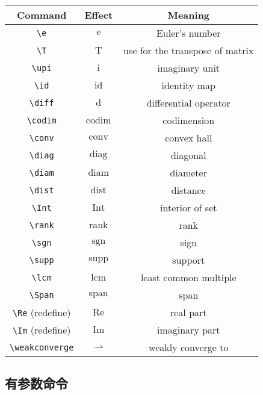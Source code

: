 \documentclass{article}
\begin{document}
\begin{center}
  \begin{tabular}{ccc}
    \toprule
      Command & Effect & Meaning \\
    \midrule
      \verb|\e|  & $\mathrm{e}$ & Euler's number \\
      \verb|\T|  & $\mathrm{T}$ & use for the transpose of matrix \\
      \verb|\upi| & $\mathrm{i}$ & imaginary unit \\
      \verb|\id|  & $\mathrm{id}$ & identity map \\
      \verb|\diff| & $\mathrm{d}$ & differential operator \\
      \verb|\codim| & $\operatorname{codim}$ & codimension \\
      \verb|\conv| & $\operatorname{conv}$ & convex hall \\
      \verb|\diag| & $\operatorname{diag}$ & diagonal \\
      \verb|\diam| & $\operatorname{diam}$ & diameter \\
      \verb|\dist| & $\operatorname{dist}$ & distance \\
      \verb|\Int|  & $\operatorname{Int}$  & interior of set \\
      \verb|\rank| & $\operatorname{rank}$ & rank \\
      \verb|\sgn|  & $\operatorname{sgn}$ & sign \\
      \verb|\supp| & $\operatorname{supp}$ & support \\
      \verb|\lcm| & $\operatorname{lcm}$ & least common multiple \\
      \verb|\Span| & $\operatorname{span}$ & span \\
      \verb|\Re| (redefine) & $\operatorname{Re}$ & real part \\
      \verb|\Im| (redefine) & $\operatorname{Im}$ & imaginary part \\
      \verb|\weakconverge|  & $\rightharpoonup$   & weakly converge to \\ 
    \bottomrule
  \end{tabular}
\end{center}


\subsection{有参数命令}
\end{document}
